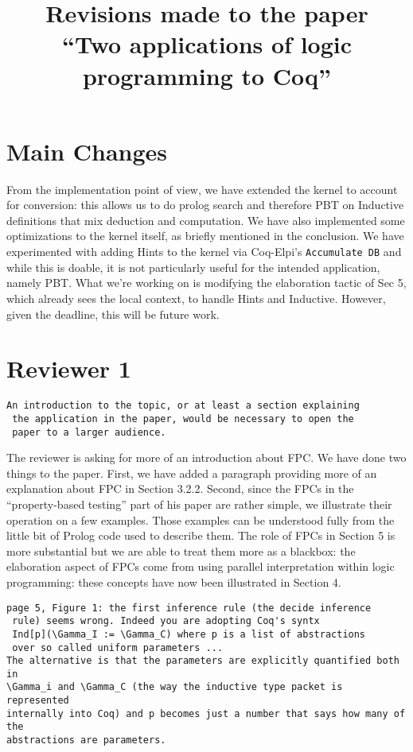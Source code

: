 \documentclass{article}
\begin{document}
\title{Revisions made to the paper \\
  ``Two applications of logic programming to Coq''}
\maketitle{}

\section*{Main Changes}

From the implementation point of view, we have extended the kernel to
account for conversion: this allows us to do prolog search and
therefore PBT on Inductive definitions that mix deduction and
computation. We have also implemented some optimizations to the kernel
itself, as briefly mentioned in the conclusion. We have experimented
with adding Hints to the kernel via Coq-Elpi's \texttt{Accumulate DB}
and while this is doable, it is not particularly useful for the
intended application, namely PBT. What we're working on is modifying
the elaboration tactic of Sec 5, which already sees the local context,
to handle Hints and Inductive. However,  given the deadline, this
will be future work.

\section*{Reviewer 1}
\begin{verbatim}
An introduction to the topic, or at least a section explaining
 the application in the paper, would be necessary to open the
 paper to a larger audience.
\end{verbatim}

The reviewer is asking for more of an introduction about FPC.  We
have done two things to the paper.  First, we have added a
paragraph providing more of an explanation about FPC in Section
3.2.2.  Second, since the FPCs in the ``property-based testing''
part of his paper are rather simple, we illustrate their
operation on a few examples.  Those examples can be understood
fully from the little bit of Prolog code used to describe them.
The role of FPCs in Section 5 is more substantial but we are able
to treat them more as a blackbox: the elaboration aspect of FPCs
come from using parallel interpretation within logic programming:
these concepts have now been illustrated in Section 4.

\begin{verbatim}
page 5, Figure 1: the first inference rule (the decide inference
 rule) seems wrong. Indeed you are adopting Coq's syntx
 Ind[p](\Gamma_I := \Gamma_C) where p is a list of abstractions
 over so called uniform parameters ...
The alternative is that the parameters are explicitly quantified both in
\Gamma_i and \Gamma_C (the way the inductive type packet is represented
internally into Coq) and p becomes just a number that says how many of the
abstractions are parameters.
\end{verbatim}
\end{document}
